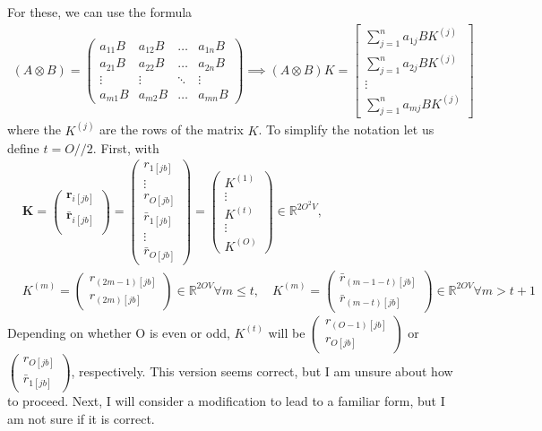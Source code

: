 For these, we can use the formula 
\begin{align}
    \left(A \otimes B\right) = \begin{pmatrix}
a_{1 1} B & a_{1 2} B & \dots & a_{1 n} B \\[6pt]
a_{2 1} B & a_{2 2} B & \dots & a_{2 n} B \\[6pt]
\vdots & \vdots & \ddots & \vdots \\[6pt]
a_{m 1} B & a_{m 2} B & \dots & a_{m n} B   
    \end{pmatrix}\implies\left(A \otimes B\right) K=\left[\begin{array}{c}\sum_{j=1}^n a_{1 j} B K^{(j)} \\ \sum_{j=1}^n a_{2 j} B K^{(j)} \\ \vdots \\ \sum_{j=1}^n a_{m j} B K^{(j)}\end{array}\right]
\end{align}
where the $K^{(j)}$ are the rows of the matrix $K$. To simplify the notation let us define $t=O//2$.
First, with
\begin{align}
    &\bm{K} = \begin{pmatrix}
\bm{r}_{i[jb]} \\
\bm{\bar{r}}_{i[{jb}]} \\
\end{pmatrix} = \begin{pmatrix}
r_{1[jb]} \\[6pt]
\vdots \\[6pt]
r_{O[jb]} \\[6pt]
\bar{r}_{1[{j} b]} \\[6pt]
\vdots \\[6pt]
\bar{r}_{O[{j} b]}
\end{pmatrix} = \begin{pmatrix}
K^{(1)} \\[6pt]
\vdots \\[6pt]
K^{(t)} \\[6pt]
\vdots \\[6pt]
K^{(O)}
\end{pmatrix}\in \mathbb{R}^{2O^2V},\\
&K^{(m)} = \begin{pmatrix}
r_{(2m-1)[jb]} \\[3pt]
{r}_{(2m)[{j} b]}
\end{pmatrix} \in \mathbb{R}^{2OV} \forall m \leq t, \quad K^{(m)} = \begin{pmatrix}
\bar{r}_{(m-1-t)[jb]} \\[3pt]
\bar{r}_{(m-t)[{j} b]}
\end{pmatrix} \in \mathbb{R}^{2OV} \forall m>t+1
\end{align}
Depending on whether O is even or odd, $K^{(t)}$ will be $\begin{pmatrix}
r_{(O-1)[jb]} \\[3pt]
r_{O[jb]}
\end{pmatrix}$ or $\begin{pmatrix}r_{O[jb]} \\[3pt]
\bar{r}_{1[{j} b]}
\end{pmatrix}$, respectively. This version seems correct, but I am unsure about how to proceed. Next, I will consider a modification to lead to a familiar form, but I am not sure if it is correct.
